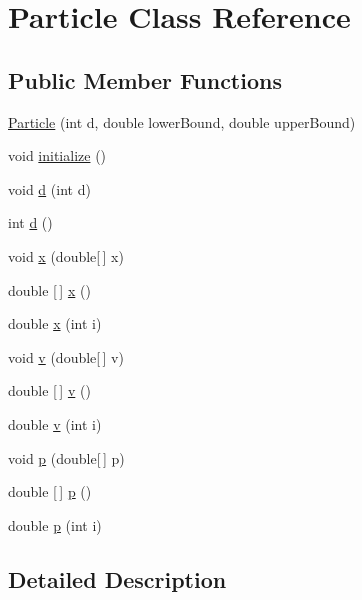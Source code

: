 \hypertarget{class_particle}{}\section{Particle Class Reference}
\label{class_particle}
\subsection*{Public Member Functions}
\begin{DoxyCompactItemize}
\item 
\hyperlink{class_particle_a064c9fe8249ad6ba0109159d9de78aa4}{Particle} (int d, double lower\+Bound, double upper\+Bound)
\item 
void \hyperlink{class_particle_a99f82d52c6e3e0454db2607f768f8cb3}{initialize} ()
\item 
void \hyperlink{class_particle_a6e62ebfe46b1233407c72e5cd1fd7a4b}{d} (int d)
\item 
int \hyperlink{class_particle_ac4efb92ddb9203e588236968d8b7b9be}{d} ()
\item 
void \hyperlink{class_particle_a421fd391e44a79cc2a32cfe635ab9df3}{x} (double\mbox{[}$\,$\mbox{]} x)
\item 
double \mbox{[}$\,$\mbox{]} \hyperlink{class_particle_a4ae274d487a3565fa11d59206c45139d}{x} ()
\item 
double \hyperlink{class_particle_a1298e71228d20427caf49481cd1d0fdf}{x} (int i)
\item 
void \hyperlink{class_particle_ad8901cfd25505e1bb17464d3d9eb03f1}{v} (double\mbox{[}$\,$\mbox{]} v)
\item 
double \mbox{[}$\,$\mbox{]} \hyperlink{class_particle_a82665a73d72400706763a8fe62a4b677}{v} ()
\item 
double \hyperlink{class_particle_aa7e430520821b6650d829f3b51752d01}{v} (int i)
\item 
void \hyperlink{class_particle_af3cd850d81af82f5357492136c7679ab}{p} (double\mbox{[}$\,$\mbox{]} p)
\item 
double \mbox{[}$\,$\mbox{]} \hyperlink{class_particle_add309fe038f8b01ffd812fd574dfeed9}{p} ()
\item 
double \hyperlink{class_particle_a3ffe07f8456b8f145631fe6e9ae01909}{p} (int i)
\end{DoxyCompactItemize}


\subsection{Detailed Description}



